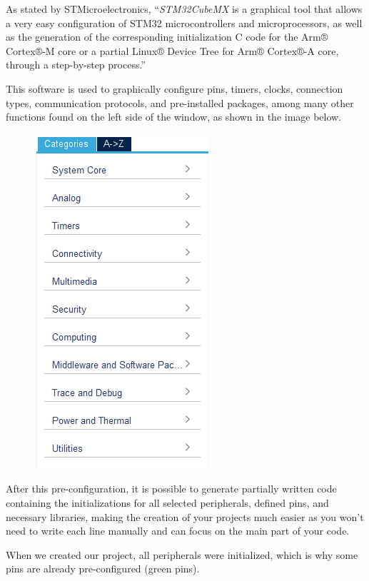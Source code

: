 \documentclass[10pt,a4paper,onecolumn]{article}
\begin{document}
As stated by STMicroelectronics, ``\textit{STM32CubeMX} is a graphical
tool that allows a very easy configuration of STM32 microcontrollers and
microprocessors, as well as the generation of the corresponding
initialization C code for the Arm® Cortex®-M core or a partial Linux®
Device Tree for Arm® Cortex®-A core, through a step-by-step process.''

This software is used to graphically configure pins, timers, clocks,
connection types, communication protocols, and pre-installed packages,
among many other functions found on the left side of the window, as
shown in the image below.

\begin{figure}[H]
  \begin{center}
    \includegraphics[width=\dimexpr\textwidth-1cm\relax,height=\dimexpr0.25\textheight-1cm\relax,keepaspectratio]{images/41.png}
  \end{center}
\end{figure}

After this pre-configuration, it is possible to generate partially
written code containing the initializations for all selected
peripherals, defined pins, and necessary libraries, making the creation
of your projects much easier as you won't need to write each line
manually and can focus on the main part of your code.

When we created our project, all peripherals were initialized, which is
why some pins are already pre-configured (green pins).
\end{document}
